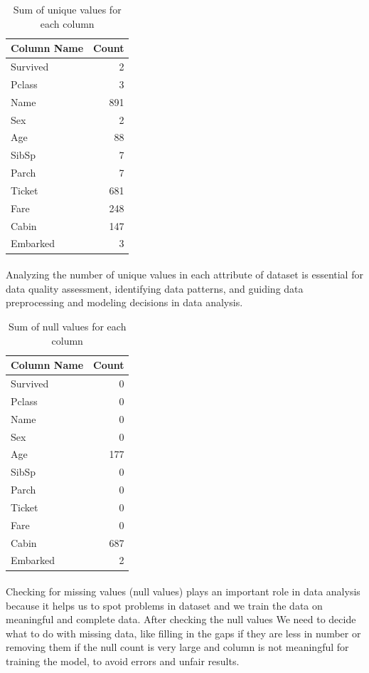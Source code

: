 \documentclass[a4paper, 12pt]{article}
\begin{document}
\begin{table}[h]
  \centering
  \begin{tabular}{lr}
    \hline
    \textbf{Column Name} & \textbf{Count} \\
    \hline
    Survived & 2 \\
    Pclass & 3 \\
    Name & 891 \\
    Sex & 2 \\
    Age & 88 \\
    SibSp & 7 \\
    Parch & 7 \\
    Ticket & 681 \\
    Fare & 248 \\
    Cabin & 147 \\
    Embarked & 3 \\
    \hline
  \end{tabular}
  \caption{Sum of unique values for each column}
  \paragraph*{}
  \justifying
Analyzing the number of unique values in each attribute of dataset is essential for data quality assessment, identifying data patterns, and guiding data preprocessing and modeling decisions in data analysis. 
\end{table} 

\begin{table}[h]
  \centering
  \begin{tabular}{lr}
    \hline
    \textbf{Column Name} & \textbf{Count} \\
    \hline
    Survived & 0 \\
    Pclass & 0 \\
    Name & 0 \\
    Sex & 0 \\
    Age & 177 \\
    SibSp & 0 \\
    Parch & 0 \\
    Ticket & 0 \\
    Fare & 0 \\
    Cabin & 687 \\
    Embarked & 2 \\
    \hline
  \end{tabular}
  \caption{Sum of null values for each column} 
  \paragraph*{}
  \justifying
Checking for missing values (null values) plays an important role in data analysis because it helps us to spot problems in dataset and we train the data on meaningful and complete data. After checking the null values We need to decide what to do with missing data, like filling in the gaps if they are less in number or removing them if the null count is very large and column is not meaningful for training the model, to avoid errors and unfair results.
\end{table} 
\end{document}
